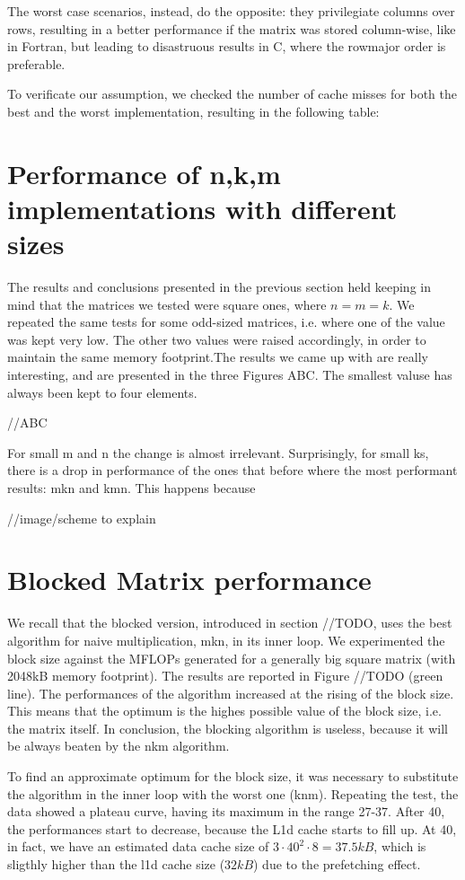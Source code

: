 The worst case scenarios, instead, do the opposite: they privilegiate columns over rows, resulting in a better performance if the matrix was stored column-wise, like in Fortran, but leading to disastruous results in C, where the rowmajor order is preferable.

To verificate our assumption, we checked the number of cache misses for both the best and the worst implementation, resulting in the following table:

\section{Performance of n,k,m implementations with different sizes}
The results and conclusions presented in the previous section held keeping in mind that the matrices we tested were square ones, where $n=m=k$. We repeated the same tests for some odd-sized matrices, i.e. where one of the value was kept very low. The other two values were raised accordingly, in order to maintain the same memory footprint.The results we came up with are really interesting, and are presented in the three Figures ABC. The smallest valuse has always been kept to four elements.

//ABC

For small m and n the change is almost irrelevant. Surprisingly, for small ks, there is a drop in performance of the ones that before where the most performant results: mkn and kmn. This happens because 

//image/scheme to explain

\section{Blocked Matrix performance}
We recall that the blocked version, introduced in section //TODO, uses the best algorithm for naive multiplication, mkn, in its inner loop. We experimented the block size against the MFLOPs generated for a generally big square matrix (with 2048kB memory footprint). The results are reported in Figure //TODO (green line). The performances of the algorithm increased at the rising of the block size. This means that the optimum is the highes possible value of the block size, i.e. the matrix itself. In conclusion, the blocking algorithm is useless, because it will be always beaten by the nkm algorithm. 

To find an approximate optimum for the block size, it was necessary to substitute the algorithm in the inner loop with the worst one (knm). Repeating the test, the data showed a plateau curve, having its maximum in the range 27-37. After 40, the performances start to decrease, because the L1d cache starts to fill up. At 40, in fact, we have an estimated data cache size of $3 \cdot 40^2 \cdot 8 = 37.5kB$, which is sligthly higher than the l1d cache size ($32kB$) due to the prefetching effect.  



